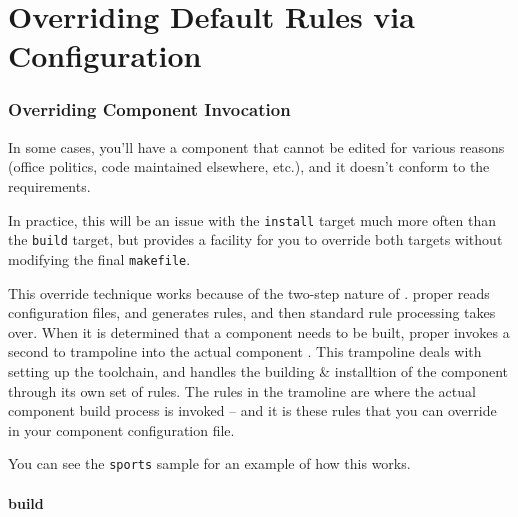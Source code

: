 %
%
%
%
\chapter{Overriding Default Rules via Configuration} \label{chap:overriding}

\subsection{Overriding Component \makefile
  Invocation}\label{wrap:override-target}

In some cases, you'll have a component \makefile that cannot be edited
for various reasons (office politics, code maintained elsewhere,
etc.), and it doesn't conform to the \lmsbw requirements.

In practice, this will be an issue with the \texttt{install} target
much more often than the \texttt{build} target, but \lmsbw provides a
facility for you to override both targets without modifying the final
\texttt{makefile}.

This override technique works because of the two-step nature of
\lmsbw.  \lmsbw proper reads configuration files, and generates \make
rules, and then standard \make rule processing takes over.  When it is
determined that a component needs to be built, \lmsbw proper invokes a
second \makefile to trampoline into the actual component \makefile.
This trampoline deals with setting up the toolchain, and handles the
building \& installtion of the component through its own set of \make
rules.  The \make rules in the tramoline \makefile are where the
actual component build process is invoked -- and it is these rules
that you can override in your component configuration file.

You can see the \texttt{sports} sample for an example of how this
works.

\subsubsection{build}\label{wrap:override-target-build}


